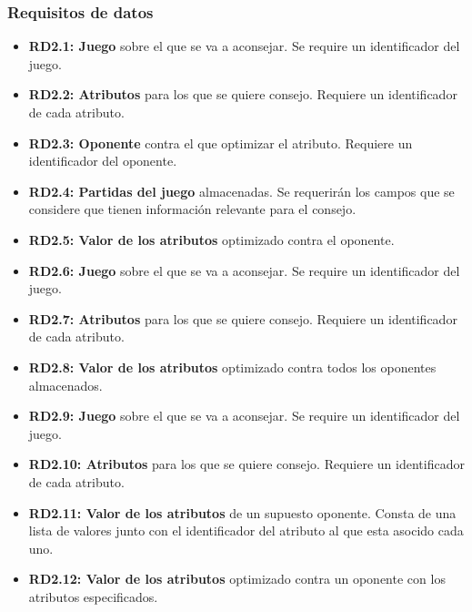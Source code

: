\subsubsection{Requisitos de datos}

	\begin{itemize}
		\item \textbf{RD2.1: Juego} sobre el que se va a aconsejar.
			Se require un identificador del juego.

		\item \textbf{RD2.2: Atributos} para los que se quiere consejo.
			Requiere un identificador de cada atributo.

		\item \textbf{RD2.3: Oponente} contra el que optimizar el atributo.
			Requiere un identificador del oponente.

		\item \textbf{RD2.4: Partidas del juego} almacenadas.
			Se requerirán los campos que se considere que tienen información
			relevante para el consejo.

		\item \textbf{RD2.5: Valor de los atributos} optimizado contra el oponente.

		\item \textbf{RD2.6: Juego} sobre el que se va a aconsejar.
			Se require un identificador del juego.

		\item \textbf{RD2.7: Atributos} para los que se quiere consejo.
			Requiere un identificador de cada atributo.

		\item \textbf{RD2.8: Valor de los atributos} optimizado contra todos los
			oponentes almacenados.

		\item \textbf{RD2.9: Juego} sobre el que se va a aconsejar.
			Se require un identificador del juego.

		\item \textbf{RD2.10: Atributos} para los que se quiere consejo.
			Requiere un identificador de cada atributo.

		\item \textbf{RD2.11: Valor de los atributos} de un supuesto oponente.
			Consta de una lista de valores junto con el identificador del
			atributo al que esta asocido cada uno.

		\item \textbf{RD2.12: Valor de los atributos} optimizado contra un oponente
			con los atributos especificados.


\end{itemize}

